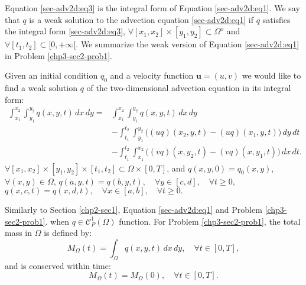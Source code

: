 Equation \eqref{sec-adv2d:eq3} is the integral form of Equation 
\eqref{sec-adv2d:eq1}. We say that ${q}$ is a weak
solution to the advection equation \eqref{sec-adv2d:eq1} if ${q}$
satisfies the integral form \eqref{sec-adv2d:eq3}, 
$\forall [x_1,x_2]\times[y_1,y_2] \subset \Omega^{\mathrm{o}}$ and 
$\forall [t_1,t_2] \subset [0,+\infty[$.
We summarize the weak version of Equation \eqref{sec-adv2d:eq1} in Problem \eqref{chp3-sec2-prob1}.
\begin{prob}
	\label{chp3-sec2-prob1}
	Given an initial condition ${q}_0$ and
	a velocity function $\boldsymbol{u} = (u,v)$
 	we would like to find a weak solution ${q}$
	of the two-dimensional advection equation in its integral form:
	\begin{align*}
		\int_{x_1}^{x_2} \int_{y_1}^{y_2}
		{q}(x, y, t) \,dx \,dy = &\int_{x_1}^{x_2} \int_{y_1}^{y_2}
		{q}(x, y, t) \,dx \,dy \\ \nonumber
		&-\int_{t_1}^{t_2} \int_{y_1}^{y_2} \bigg({(uq)}(x_2, y, t)
		-{(uq)}(x_1, y, t) \bigg) \,dy \,dt\\ \nonumber
		&-\int_{t_1}^{t_2} \int_{x_1}^{x_2} \bigg({(vq)}(x, y_2, t)
		-{(vq)}(x, y_1, t) \bigg) \,dx \,dt.
	\end{align*}
	$\forall [x_1, x_2]\times [y_1, y_2] \times[t_1, t_2] \subset \Omega \times[0,T]$, 
	and ${q}(x, y, 0) = {q}_0(x, y)$, $\forall (x, y) \in \Omega$,
   ${q}(a, y, t) = {q}(b, y, t), \quad \forall y \in [c,d],  \quad \forall t\geq 0,$
   ${q}(x, c, t) = {q}(x, d, t), \quad \forall x \in [a,b],  \quad \forall t\geq 0.$
\end{prob}
Similarly to Section \ref{chp2-sec1}, Equation \eqref{sec-adv2d:eq1} and Problem \eqref{chp3-sec2-prob1}.
when ${q} \in \mathcal{C}^1_P{(\Omega)}$ function.
For Problem \ref{chp3-sec2-prob1}, the total mass in $\Omega$ is defined by: 
\begin{equation}
	{M}_{\Omega}(t) = \int_{\Omega} {q}(x,y,t) \,dx \,dy , \quad \forall t \in [0,T],
\end{equation}
and is conserved within time: 
\begin{equation}
	{M}_{\Omega}(t) = {M}_{\Omega}(0), \quad \forall t \in [0,T].
\end{equation}

